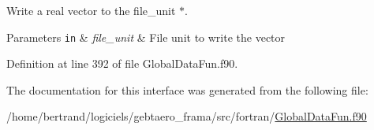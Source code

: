 Write a real vector to the file\+\_\+unit $\ast$. 


\begin{DoxyParams}[1]{Parameters}
\mbox{\tt in}  & {\em file\+\_\+unit} & File unit to write the vector \\
\hline
\end{DoxyParams}


Definition at line 392 of file Global\+Data\+Fun.\+f90.



The documentation for this interface was generated from the following file\+:\begin{DoxyCompactItemize}
\item 
/home/bertrand/logiciels/gebtaero\+\_\+frama/src/fortran/\hyperlink{_global_data_fun_8f90}{Global\+Data\+Fun.\+f90}\end{DoxyCompactItemize}
